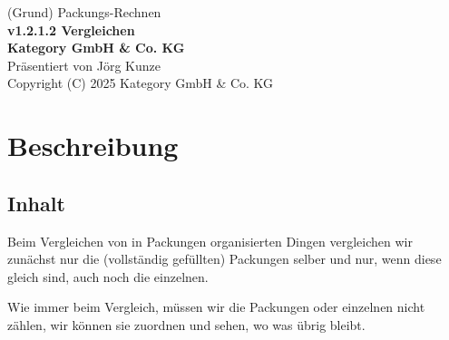 \documentclass[a4paper]{amsart}
\theoremstyle{definition}
\begin{document}
\begin{titlepage}
\centering
{\huge
(Grund) Packungs-Rechnen\\[1cm]
\textbf{v1.2.1.2 Vergleichen}
}\\[1cm]

\textbf{Kategory GmbH \& Co. KG}\\
Präsentiert von Jörg Kunze\\
Copyright (C) 2025 Kategory GmbH \& Co. KG

\end{titlepage}

%

\newpage

\section*{Beschreibung}

\subsection*{Inhalt}
Beim Vergleichen von in Packungen organisierten Dingen vergleichen wir zunächst nur die (vollständig gefüllten) Packungen selber und nur, wenn diese gleich sind, auch noch die einzelnen.

Wie immer beim Vergleich, müssen wir die Packungen oder einzelnen nicht zählen, wir können sie zuordnen und sehen, wo was übrig bleibt.
\end{document}
